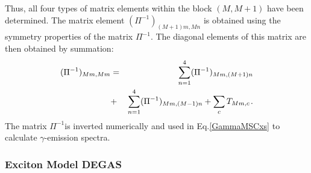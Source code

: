 Thus, all four types of matrix elements within the block $(M,M+1)$ have been
determined. The matrix element $(\Pi^{-1})_{(M+1)m,Mn}$ is obtained using
the symmetry properties of the matrix $\Pi^{-1}$. The diagonal elements of
this matrix are then obtained by summation:
\begin{eqnarray}
(\Pi^{-1})_{Mm,Mm} &=& \sum_{n=1}^{4}(\Pi^{-1})_{Mm,(M+1)n} \\
&+& \sum_{n=1}^{4}(\Pi^{-1})_{Mm,(M-1)n} + \sum_{c}T_{Mm,c} \hspace{1pt}.
\notag
\end{eqnarray}
The matrix $\Pi^{-1}$is inverted numerically and used in Eq.\ref{GammaMSCxs}
to calculate $\gamma$-emission spectra.


\subsubsection{Exciton Model DEGAS\label{DEGAS}}

